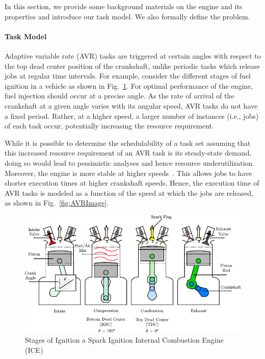 In this section, we provide some background materials on the engine and its properties and introduce our task model.
We also formally define the problem.
\paragraph{Task Model}
Adaptive variable rate (AVR) tasks are triggered at certain angles with respect to the top dead center position of the crankshaft, unlike periodic tasks which release jobs at regular time intervals.
For example, consider the different stages of fuel ignition in a vehicle as shown in Fig.~\ref{fig:Engine}.
For optimal performance of the engine, fuel injection should occur at a precise angle.
As the rate of arrival of the crankshaft at a given angle varies with its angular speed, AVR tasks do not have a fixed period.
Rather, at a higher speed, a larger number of instances (i.e., jobs) of each task occur, potentially increasing the resource requirement.

While it is possible to determine the schedulability of a task set assuming that this increased resource requirement of an AVR task is its steady-state demand, doing so would lead to pessimistic analyses and hence resource underutilization.
Moreover, the engine is more stable at higher speeds~\cite{dbuttle_real-time_nodate}.
This allows jobs to have shorter execution times at higher crankshaft speeds.
Hence, the execution time of AVR tasks is modeled as a function of the speed at which the jobs are released, as shown in Fig.~\ref{fig:AVRImage}.


\begin{figure}
    \centering
    \includegraphics[width=0.9\linewidth]{fig/combustionCycle-4step.pdf}
    \caption{Stages of Ignition a Spark Ignition Internal Combustion Engine (ICE)}
    \label{fig:Engine}
\end{figure}

